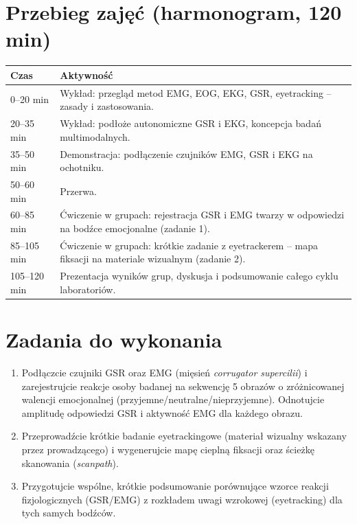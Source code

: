 \documentclass[11pt,a4paper]{article}
\begin{document}
\section{Przebieg zajęć (harmonogram, 120 min)}
\begin{center}
\begin{tabular}{@{}p{2.3cm}p{11.7cm}@{}}
\toprule
\textbf{Czas} & \textbf{Aktywność}\\
\midrule
0--20 min & Wykład: przegląd metod EMG, EOG, EKG, GSR, eyetracking -- zasady i zastosowania.\\
20--35 min & Wykład: podłoże autonomiczne GSR i EKG, koncepcja badań multimodalnych.\\
35--50 min & Demonstracja: podłączenie czujników EMG, GSR i EKG na ochotniku.\\
50--60 min & Przerwa.\\
60--85 min & Ćwiczenie w grupach: rejestracja GSR i EMG twarzy w odpowiedzi na bodźce emocjonalne (zadanie 1).\\
85--105 min & Ćwiczenie w grupach: krótkie zadanie z eyetrackerem -- mapa fiksacji na materiale wizualnym (zadanie 2).\\
105--120 min & Prezentacja wyników grup, dyskusja i podsumowanie całego cyklu laboratoriów.\\
\bottomrule
\end{tabular}
\end{center}

\section{Zadania do wykonania}
\begin{enumerate}[label=\textbf{Zadanie \arabic*.}, leftmargin=2.7cm]
  \item Podłączcie czujniki GSR oraz EMG (mięsień \emph{corrugator supercilii}) i zarejestrujcie reakcje osoby badanej na sekwencję 5 obrazów o zróżnicowanej walencji emocjonalnej (przyjemne/neutralne/nieprzyjemne). Odnotujcie amplitudę odpowiedzi GSR i aktywność EMG dla każdego obrazu.
  \item Przeprowadźcie krótkie badanie eyetrackingowe (materiał wizualny wskazany przez prowadzącego) i wygenerujcie mapę cieplną fiksacji oraz ścieżkę skanowania (\emph{scanpath}).
  \item Przygotujcie wspólne, krótkie podsumowanie porównujące wzorce reakcji fizjologicznych (GSR/EMG) z rozkładem uwagi wzrokowej (eyetracking) dla tych samych bodźców.
\end{enumerate}
\end{document}
